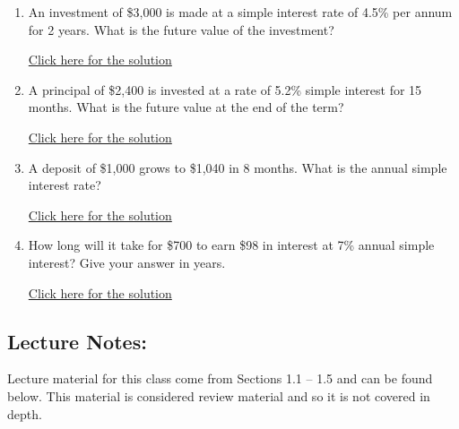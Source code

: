 \documentclass[
]{book}
\providecommand{\tightlist}{%
  \setlength{\itemsep}{0pt}\setlength{\parskip}{0pt}}
\begin{document}
\begin{enumerate}
\def\labelenumi{\arabic{enumi}.}
\tightlist
\item
  An investment of \$3,000 is made at a simple interest rate of 4.5\% per annum for 2 years. What is the future value of the investment?

  \href{https://youtu.be/7qmcWXW8fos}{Click here for the solution}
\item
  A principal of \$2,400 is invested at a rate of 5.2\% simple interest for 15 months. What is the future value at the end of the term?

  \href{https://youtu.be/OxLt9Az2QA8}{Click here for the solution}
\item
  A deposit of \$1,000 grows to \$1,040 in 8 months. What is the annual simple interest rate?

  \href{https://youtu.be/D1t4ZLWUpVI}{Click here for the solution}
\item
  How long will it take for \$700 to earn \$98 in interest at 7\% annual simple interest? Give your answer in years.

  \href{https://youtu.be/inwp5jWlTSo}{Click here for the solution}
\end{enumerate}

\subsection*{Lecture Notes:}\label{lecture-notes-8}

Lecture material for this class come from Sections 1.1 -- 1.5 and can be found below. This material is considered review material and so it is not covered in depth.
\end{document}

